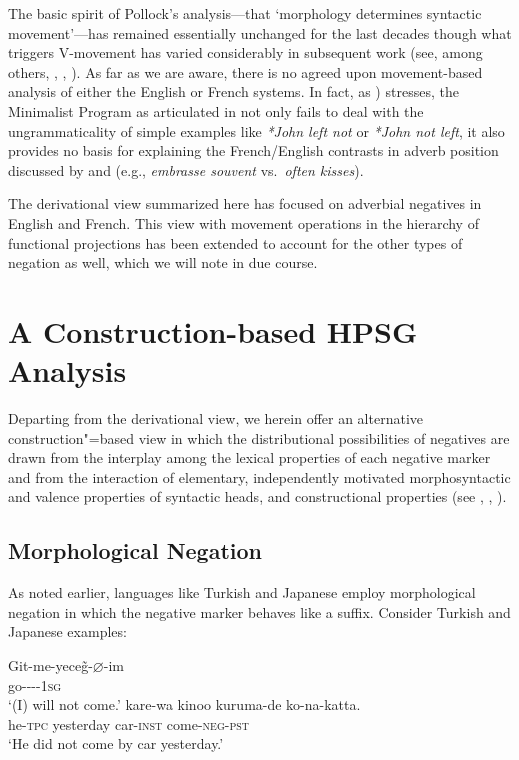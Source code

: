 \documentclass[output=paper]{langsci/langscibook}
\begin{document}
{The basic spirit of Pollock's analysis---that `morphology determines syntactic movement'---has
remained essentially unchanged for the last decades though what triggers V-movement has varied
considerably in subsequent work (see, among others, \citet{Zanuttini:01}, \citet{Bo:14},
\citet{Zeijlstra:15}).  As far as we are aware, there is no agreed upon movement-based analysis of
either the English or French systems. In fact, as \citet{Lasnik:00}) stresses, the Minimalist
Program as articulated in \citet{Chomsky:93,Chomsky:95,Chomsky:00-mini-inq} not only fails to deal with the
ungrammaticality of simple examples like \textit{*John left not} or \textit{*John not left}, it also
provides no basis for explaining the French/English contrasts in adverb position discussed by
\citet{Pollock:89} and \citet{Cinque:99} (e.g., \textit{embrasse souvent} vs.\ \textit{often
  kisses}).


The derivational view summarized here has focused on adverbial negatives
in English and French. This view with movement operations in the
 hierarchy of functional projections has been extended to account for the other types of negation as well, which we will note in due course.

\section{A Construction-based HPSG Analysis}

Departing from the derivational view, we herein offer an alternative construction"=based view in which the distributional possibilities of negatives
are drawn from the interplay among the lexical properties of each negative marker
and from the interaction of elementary, independently motivated
morphosyntactic and valence properties of syntactic heads, and constructional
properties (see \citet{Kim:00}, \citet{KS:02}, \citet{Crowgey:12}).


\subsection{Morphological Negation}

As noted earlier, languages like Turkish and Japanese employ morphological negation in which the negative marker behaves like a suffix. Consider
Turkish and Japanese examples:



\eal
\ex
\gll Git-me-yece\~{g}-$\varnothing$-im \\
     go-\NEG-\FUT-\COP-\textsc{1sg} \\
\glt `(I) will not come.'
\ex
\gll kare-wa kinoo kuruma-de ko-na-katta. \\
     he-\textsc{tpc} yesterday car-\textsc{inst} come-\textsc{neg}-\textsc{pst} \\
\glt `He did not come by car yesterday.'
\zl




}
\end{document}
